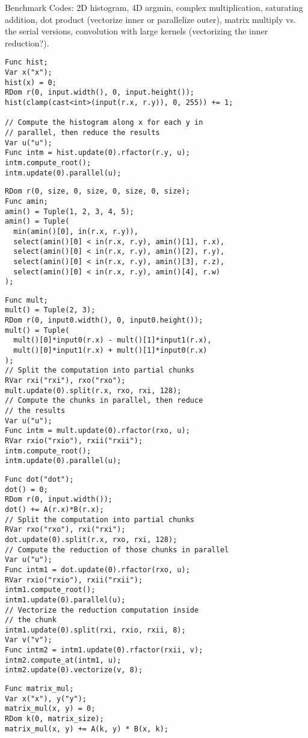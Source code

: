 Benchmark Codes:
2D histogram, 4D argmin, complex multiplication, saturating addition, dot product (vectorize inner or parallelize outer), matrix multiply vs. the serial versions, convolution with large kernels (vectorizing the inner reduction?). 

\begin{lstlisting}[caption={Benchmark code for histogram of a two-dimensional image.}, label={lst:benchmark_histogram}]
Func hist;
Var x("x");
hist(x) = 0;
RDom r(0, input.width(), 0, input.height());
hist(clamp(cast<int>(input(r.x, r.y)), 0, 255)) += 1;

// Compute the histogram along x for each y in
// parallel, then reduce the results
Var u("u");
Func intm = hist.update(0).rfactor(r.y, u);
intm.compute_root();
intm.update(0).parallel(u);
\end{lstlisting}

\begin{lstlisting}[caption={Benchmark code for argmin over 4D array}, label={lst:benchmark_argmin}]
RDom r(0, size, 0, size, 0, size, 0, size);
Func amin;
amin() = Tuple(1, 2, 3, 4, 5);
amin() = Tuple(
  min(amin()[0], in(r.x, r.y)),
  select(amin()[0] < in(r.x, r.y), amin()[1], r.x),
  select(amin()[0] < in(r.x, r.y), amin()[2], r.y),
  select(amin()[0] < in(r.x, r.y), amin()[3], r.z),
  select(amin()[0] < in(r.x, r.y), amin()[4], r.w)
);
\end{lstlisting}

\begin{lstlisting}[caption={Benchmark code for multiplication of complex number}, label={lst:benchmark_complex_multiply}]
Func mult;
mult() = Tuple(2, 3);
RDom r(0, input0.width(), 0, input0.height());
mult() = Tuple(
  mult()[0]*input0(r.x) - mult()[1]*input1(r.x),
  mult()[0]*input1(r.x) + mult()[1]*input0(r.x)
);
// Split the computation into partial chunks
RVar rxi("rxi"), rxo("rxo");
mult.update(0).split(r.x, rxo, rxi, 128);
// Compute the chunks in parallel, then reduce 
// the results
Var u("u");
Func intm = mult.update(0).rfactor(rxo, u);
RVar rxio("rxio"), rxii("rxii");
intm.compute_root();
intm.update(0).parallel(u);
\end{lstlisting}

\begin{lstlisting}[caption={Benchmark code for dot product}, label={lst:benchmark_dot_product}]
Func dot("dot");
dot() = 0;
RDom r(0, input.width());
dot() += A(r.x)*B(r.x);
// Split the computation into partial chunks
RVar rxo("rxo"), rxi("rxi");
dot.update(0).split(r.x, rxo, rxi, 128);
// Compute the reduction of those chunks in parallel
Var u("u");
Func intm1 = dot.update(0).rfactor(rxo, u);
RVar rxio("rxio"), rxii("rxii");
intm1.compute_root();
intm1.update(0).parallel(u);
// Vectorize the reduction computation inside 
// the chunk
intm1.update(0).split(rxi, rxio, rxii, 8);
Var v("v");
Func intm2 = intm1.update(0).rfactor(rxii, v);
intm2.compute_at(intm1, u);
intm2.update(0).vectorize(v, 8);
\end{lstlisting}

\begin{lstlisting}[caption={Benchmark code for square matrix multiplication.}, label={lst:benchmark_matrix}]
Func matrix_mul;
Var x("x"), y("y");
matrix_mul(x, y) = 0;
RDom k(0, matrix_size);
matrix_mul(x, y) += A(k, y) * B(x, k);
\end{lstlisting}
